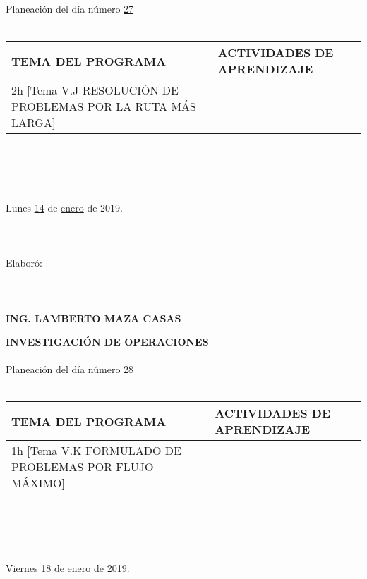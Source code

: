 \documentclass[landscape]{article}
\begin{document}
{\begin{center}
{}
\ \\
\ \\
Planeaci\'on del d\'ia n\'umero \underline{\hspace{0.5cm}27\hspace{0.5cm}}
\ \\
\ \\
\begin{tabular}{|p{11cm}|p{8cm}|}\hline
{\bf TEMA DEL PROGRAMA}&{\bf ACTIVIDADES DE APRENDIZAJE}\\\hline
	2h	[Tema V.J RESOLUCI\'ON DE PROBLEMAS POR LA RUTA M\'AS LARGA]
&\\
\hline
\end{tabular}
\ \\
\ \\
\ \\
\ \\
Lunes \underline{\hspace{0.5cm}14\hspace{0.5cm}} de  \underline{\hspace{0.5cm}enero\hspace{0.5cm}} de 2019.
\ \\
\ \\
\ \\
\ \\
Elabor\'o:
\ \\
\ \\
\ \\
\ \\
{\bf ING. LAMBERTO MAZA CASAS}
\end{center}
\eject
\begin{center}
{\bf 
INVESTIGACI\'ON DE OPERACIONES
}
\ \\
\ \\
Planeaci\'on del d\'ia n\'umero \underline{\hspace{0.5cm}28\hspace{0.5cm}}
\ \\
\ \\
\begin{tabular}{|p{11cm}|p{8cm}|}\hline
{\bf TEMA DEL PROGRAMA}&{\bf ACTIVIDADES DE APRENDIZAJE}\\\hline
	1h	[Tema V.K FORMULADO DE PROBLEMAS POR FLUJO M\'AXIMO]
&\\
\hline
\end{tabular}
\ \\
\ \\
\ \\
\ \\
Viernes \underline{\hspace{0.5cm}18\hspace{0.5cm}} de  \underline{\hspace{0.5cm}enero\hspace{0.5cm}} de 2019.

\end{center}}
\end{document}
